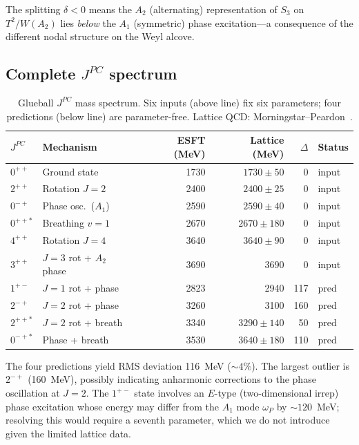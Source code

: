 \documentclass[a4paper,12pt]{article}
\begin{document}
The splitting $\delta < 0$ means the $A_2$ (alternating)
representation of $S_3$ on $T^2/W(A_2)$ lies \emph{below} the
$A_1$ (symmetric) phase excitation---a consequence of the different
nodal structure on the Weyl alcove.

\subsection{Complete $J^{PC}$ spectrum}

\begin{table}[t]
\centering
\caption{Glueball $J^{PC}$ mass spectrum. Six inputs (above line)
fix six parameters; four predictions (below line) are
parameter-free. Lattice QCD: Morningstar--Peardon~\cite{Morningstar1999}.}
\label{tab:glueball}
\begin{tabular}{@{}llrrrl@{}}
\toprule
$J^{PC}$ & Mechanism & ESFT (MeV) & Lattice (MeV) & $\Delta$ & Status \\
\midrule
$0^{++}$ & Ground state & 1730 & $1730 \pm 50$ & 0 & input \\
$2^{++}$ & Rotation $J\!=\!2$ & 2400 & $2400 \pm 25$ & 0 & input \\
$0^{-+}$ & Phase osc.\ ($A_1$) & 2590 & $2590 \pm 40$ & 0 & input \\
$0^{++*}$ & Breathing $v\!=\!1$ & 2670 & $2670 \pm 180$ & 0 & input \\
$4^{++}$ & Rotation $J\!=\!4$ & 3640 & $3640 \pm 90$ & 0 & input \\
$3^{++}$ & $J\!=\!3$ rot + $A_2$ phase & 3690 & 3690 & 0 & input \\
\midrule
$1^{+-}$ & $J\!=\!1$ rot + phase & 2823 & 2940 & 117 & pred \\
$2^{-+}$ & $J\!=\!2$ rot + phase & 3260 & 3100 & 160 & pred \\
$2^{++*}$ & $J\!=\!2$ rot + breath & 3340 & $3290 \pm 140$ & 50 & pred \\
$0^{-+*}$ & Phase + breath & 3530 & $3640 \pm 180$ & 110 & pred \\
\bottomrule
\end{tabular}
\end{table}

The four predictions yield RMS deviation 116~MeV ($\sim\!4\%$).
The largest outlier is $2^{-+}$ (160~MeV), possibly indicating
anharmonic corrections to the phase oscillation at $J = 2$.
The $1^{+-}$ state involves an $E$-type (two-dimensional irrep)
phase excitation whose energy may differ from the $A_1$ mode
$\omega_P$ by $\sim\!120$~MeV; resolving this would require a
seventh parameter, which we do not introduce given the limited
lattice data.
\end{document}
